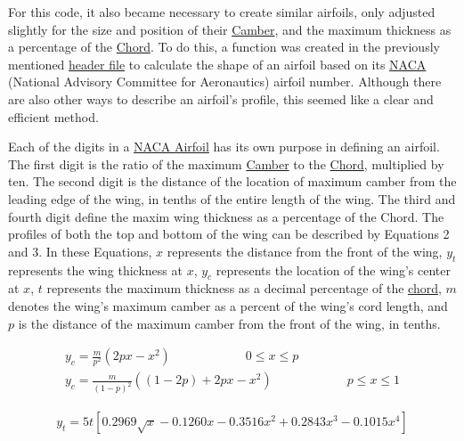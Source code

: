 \documentclass{article}
\begin{document}
For this code, it also became necessary to create similar airfoils, only adjusted slightly for the size and position of their \hyperlink{Camber}{Camber}, and the maximum thickness as a percentage of the \hyperlink{c}{Chord}. To do this, a function was created in the previously mentioned \href{https://github.com/JoeSpencer1/497R-Projects/blob/Airfoil-Analysis/Airfoil_Functions.jl}{header file} to calculate the shape of an airfoil based on its \hyperlink{NACA}{NACA} (National Advisory Committee for Aeronautics) airfoil number. Although there are also other ways to describe an airfoil's profile, this seemed like a clear and efficient method.\newline

Each of the digits in a \hyperlink{NACA}{NACA Airfoil} has its own purpose in defining an airfoil. The first digit is the ratio of the maximum \hyperlink{Camber}{Camber} to the \hyperlink{c}{Chord}, multiplied by ten. The second digit is the distance of the location of maximum camber from the leading edge of the wing, in tenths of the entire length of the wing. The third and fourth digit define the maxim wing thickness as a percentage of the Chord. The profiles of both the top and bottom of the wing can be described by Equations 2 and 3. In these Equations, $x$ represents the distance from the front of the wing, $y_{t}$ represents the wing thickness at $x$, $y_{c}$ represents the location of the wing's center at $x$, $t$ represents the maximum thickness as a decimal percentage of the \hyperlink{c}{chord}, $m$ denotes the wing's maximum camber as a percent of the wing's cord length, and $p$ is the distance of the maximum camber from the front of the wing, in tenths. \newline

\begin{equation} \label{eq:2}
\begin{aligned}
	y_{c} = \frac{m}{p^2} (2 p x - x^2) \qquad \qquad \qquad 0 \leq x \leq p \\
	y_{c} = \frac{m}{(1 - p)^2} ((1 - 2 p) + 2 p x - x^2) \qquad \qquad \qquad p \leq x \leq 1
\end{aligned}
\end{equation}

\begin{equation} \label{eq:3}
\begin{aligned}
	y_{t} = 5 t [ 0.2969 \sqrt{x} - 0.1260 x - 0.3516 x^{2} + 0.2843 x^{3} - 0.1015 x^{4}]
\end{aligned}
\end{equation}
\end{document}
